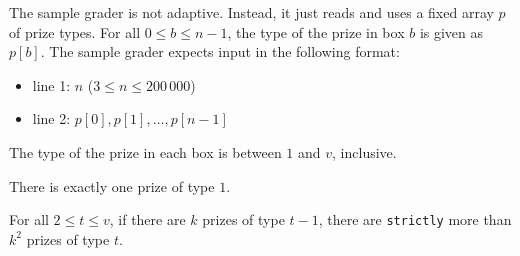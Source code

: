 The sample grader is not adaptive. Instead, it just reads and uses a fixed array $p$ of prize types. For all $0 \leq b \leq n - 1$, the type of the prize in box $b$ is given as $p[b]$. The sample grader expects input in the following format:

\begin{itemize}
\item line 1: $n$ ($3 \leq n \leq 200\,000$)
\item line 2: $p[0], p[1], \ldots, p[n - 1]$
\end{itemize}

The type of the prize in each box is between $1$ and $v$, inclusive.

There is exactly one prize of type $1$.

For all $2 \le t \le v$, if there are $k$ prizes of type $t - 1$, there are \texttt{strictly} more than $k ^ 2$ prizes of type $t$.